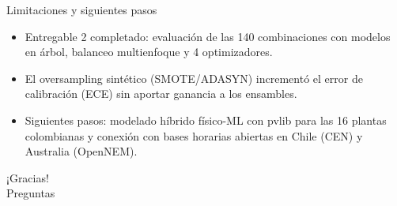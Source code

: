 \documentclass[aspectratio=169,10pt]{beamer}
\begin{document}
\begin{frame}{Limitaciones y siguientes pasos}
  \begin{itemize}
    \item Entregable 2 completado: evaluación de las 140 combinaciones con modelos en árbol, balanceo multienfoque y 4 optimizadores.
    \item El oversampling sintético (SMOTE/ADASYN) incrementó el error de calibración (ECE) sin aportar ganancia a los ensambles.
    \item Siguientes pasos: modelado híbrido físico-ML con pvlib para las 16 plantas colombianas y conexión con bases horarias abiertas en Chile (CEN) y Australia (OpenNEM).
  \end{itemize}
\end{frame}

\begin{frame}[standout]
  ¡Gracias!\\[0.6em]
  {\normalsize Preguntas}
\end{frame}

\appendix
\end{document}
